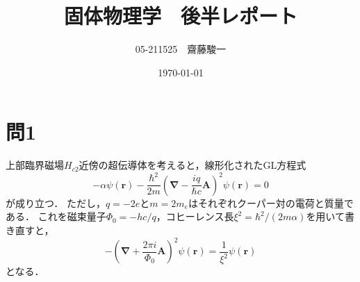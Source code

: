 \documentclass[a4paper,11pt]{jsarticle}
\begin{document}
\title{固体物理学　後半レポート}
\author{05-211525　齋藤駿一}
\date{\today}
\maketitle

\section*{問1}
上部臨界磁場$H_{c2}$近傍の超伝導体を考えると，線形化されたGL方程式
\begin{equation}
  -\alpha \psi(\bm{r}) - \frac{\hbar^2}{2m}\left(\bm{\nabla} - \frac{iq}{\hbar c}\bm{A}\right)^2 \psi(\bm{r}) = 0 
\end{equation}
が成り立つ．
ただし，$q=-2e$と$m=2m_e$はそれぞれクーパー対の電荷と質量である．
これを磁束量子$\Phi_0 = - hc/q$，コヒーレンス長$\xi^2 = \hbar^2/(2m\alpha)$を用いて書き直すと，
\begin{equation}
  -\left(\bm{\nabla}+\frac{2\pi i}{\Phi_0}\bm{A}\right)^2 \psi(\bm{r}) = \frac{1}{\xi^2}\psi(\bm{r}) \label{eq}
\end{equation}
となる．
\end{document}
